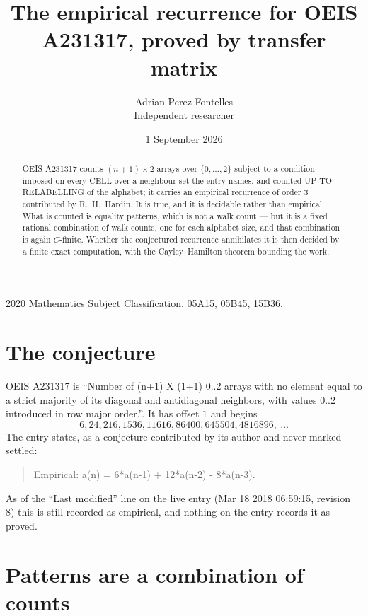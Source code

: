 \documentclass[11pt,a4paper]{article}
\title{The empirical recurrence for OEIS A231317, proved by transfer matrix}
\author{Adrian Perez Fontelles\\ \small Independent researcher}
\date{1 September 2026}
\theoremstyle{plain}
\theoremstyle{definition}
\begin{document}
\maketitle

\begin{abstract}
OEIS A231317 counts $(n+1)\times2$ arrays over $\{0,\dots,2\}$ subject to a condition imposed on
every CELL over a neighbour set the entry names, and counted UP TO RELABELLING of the
alphabet; it carries an empirical recurrence of order $3$ contributed by
R.~H.~Hardin. It is true, and it is decidable rather than empirical. What is counted is
equality patterns, which is not a walk count --- but it is a fixed rational combination of
walk counts, one for each alphabet size, and that combination is again $C$-finite. Whether the
conjectured recurrence annihilates it is then decided by a finite exact computation, with the
Cayley--Hamilton theorem bounding the work.
\end{abstract}

\noindent\small 2020 Mathematics Subject Classification. 05A15, 05B45, 15B36.\normalsize

\section{The conjecture}

OEIS A231317 is ``Number of (n+1) X (1+1) 0..2 arrays with no element equal to a strict majority of its diagonal and antidiagonal neighbors, with values 0..2 introduced in row major order.''. It has offset $1$ and begins
\[
6, 24, 216, 1536, 11616, 86400, 645504, 4816896,\ \dots
\]
The entry states, as a conjecture contributed by its author and never marked settled:
\begin{quote}
Empirical: a(n) = 6*a(n-1) + 12*a(n-2) - 8*a(n-3).
\end{quote}
As of the ``Last modified'' line on the live entry (Mar 18 2018 06:59:15, revision 8) this is still
recorded as empirical, and nothing on the entry records it as proved.

\section{Patterns are a combination of counts}
\end{document}
